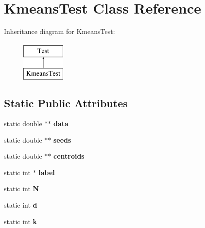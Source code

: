 \hypertarget{classKmeansTest}{\section{Kmeans\+Test Class Reference}
\label{classKmeansTest}
}
Inheritance diagram for Kmeans\+Test\+:\begin{figure}[H]
\begin{center}
\leavevmode
\includegraphics[height=2.000000cm]{classKmeansTest}
\end{center}
\end{figure}
\subsection*{Static Public Attributes}
\begin{DoxyCompactItemize}
\item 
\hypertarget{classKmeansTest_ac49bc85d7f0c6573fdb41291fcad7ea8}{static double $\ast$$\ast$ {\bfseries data}}\label{classKmeansTest_ac49bc85d7f0c6573fdb41291fcad7ea8}

\item 
\hypertarget{classKmeansTest_a02a49c0447e8979c5e42e80798f1909d}{static double $\ast$$\ast$ {\bfseries seeds}}\label{classKmeansTest_a02a49c0447e8979c5e42e80798f1909d}

\item 
\hypertarget{classKmeansTest_ad1d5e54851950f37170c362518fc5aef}{static double $\ast$$\ast$ {\bfseries centroids}}\label{classKmeansTest_ad1d5e54851950f37170c362518fc5aef}

\item 
\hypertarget{classKmeansTest_a25c209617b626d0e70e62fbf7dd2d041}{static int $\ast$ {\bfseries label}}\label{classKmeansTest_a25c209617b626d0e70e62fbf7dd2d041}

\item 
\hypertarget{classKmeansTest_a881736055281c3d2d5f161a57f37b810}{static int {\bfseries N}}\label{classKmeansTest_a881736055281c3d2d5f161a57f37b810}

\item 
\hypertarget{classKmeansTest_a08d592368c02b1aabe71c26b34796bf6}{static int {\bfseries d}}\label{classKmeansTest_a08d592368c02b1aabe71c26b34796bf6}

\item 
\hypertarget{classKmeansTest_a044e6c5eff9a1a3ddb542771c226bd7b}{static int {\bfseries k}}\label{classKmeansTest_a044e6c5eff9a1a3ddb542771c226bd7b}

\end{DoxyCompactItemize}

